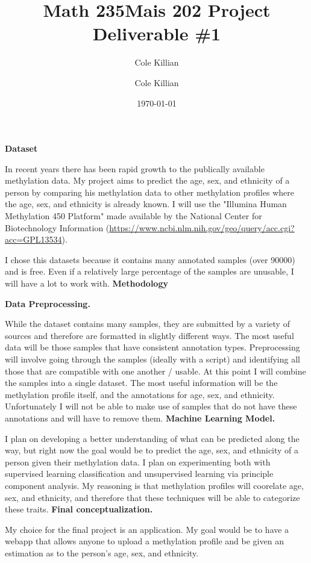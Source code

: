 \documentclass[12pt]{scrartcl}
\title{Math 235}
\date{\today}
\author{Cole Killian}
\begin{document}
\title{Mais 202 Project Deliverable \#1}
\author{Cole Killian}

\maketitle


\begin{enumerate}
  \ii
  \textbf{Dataset}

  In recent years there has been rapid growth to the publically available methylation data. My project aims to predict the age, sex, and ethnicity of a person by comparing his methylation data to other methylation profiles where the age, sex, and ethnicity is already known. I will use the "Illumina Human Methylation 450 Platform" made available by the National Center for Biotechnology Information (\href{https://www.ncbi.nlm.nih.gov/geo/query/acc.cgi?acc=GPL13534}{https://www.ncbi.nlm.nih.gov/geo/query/acc.cgi?acc=GPL13534}).

  I chose this datasets because it contains many annotated samples (over 90000) and is free. Even if a relatively large percentage of the samples are unusable, I will have a lot to work with.
  \ii
  \textbf{Methodology}

  \begin{enumerate}[label=\alph*)]
    \ii
    \textbf{Data Preprocessing.} 

    While the dataset contains many samples, they are submitted by a variety of sources and therefore are formatted in slightly different ways. The most useful data will be those samples that have consistent annotation types.  Preprocessing will involve going through the samples (ideally with a script) and identifying all those that are compatible with one another / usable. At this point I will combine the samples into a single dataset. The most useful information will be the methylation profile itself, and the annotations for age, sex, and ethnicity. Unfortunately I will not be able to make use of samples that do not have these annotations and will have to remove them.
    \ii
    \textbf{Machine Learning Model.} 

    I plan on developing a better understanding of what can be predicted along the way, but right now the goal would be to predict the age, sex, and ethnicity of a person given their methylation data. I plan on experimenting both with supervised learning classification and unsupervised learning via principle component analysis. My reasoning is that methylation profiles will coorelate age, sex, and ethnicity, and therefore that these techniques will be able to categorize these traits.
    \ii
    \textbf{Final conceptualization.} 

    My choice for the final project is an application. My goal would be to have a webapp that allows anyone to upload a methylation profile and be given an estimation as to the person's age, sex, and ethnicity.
  \end{enumerate}


\end{enumerate}
\end{document}
